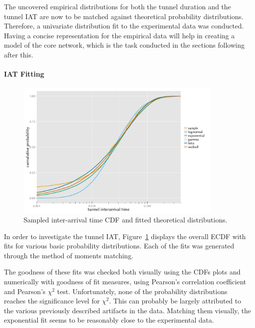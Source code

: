 The uncovered empirical distributions for both the tunnel duration and the tunnel \gls{IAT} are now to be matched against theoretical probability distributions. Therefore, a univariate distribution fit to the experimental data was conducted. Having a concise representation for the empirical data will help in creating a model of the core network, which is the task conducted in the sections following after this.


\paragraph{\gls{IAT} Fitting}

\begin{figure}[htb]
	\centering
	\includegraphics[width=0.9\textwidth]{images/R-IAT-ecdfs.pdf}
	\caption{Sampled inter-arrival time \acrshort{CDF} and fitted theoretical distributions.}
\label{c4:fig:IAT-cdfs}
\end{figure}

In order to investigate the tunnel \gls{IAT}, Figure~\ref{c4:fig:IAT-cdfs} displays the overall \gls{ECDF} with fits for various basic probability distributions. Each of the fits was generated through the method of moments matching.

The goodness of these fits was checked both visually using the \glspl{CDF} plots and numerically with goodness of fit measures, using Pearson's correlation coefficient and Pearson's $\chi^2$ test. Unfortunately, none of the probability distributions reaches the significance level for $\chi^2$. This can probably be largely attributed to the various previously described artifacts in the data. Matching them visually, the exponential fit seems to be reasonably close to the experimental data.

